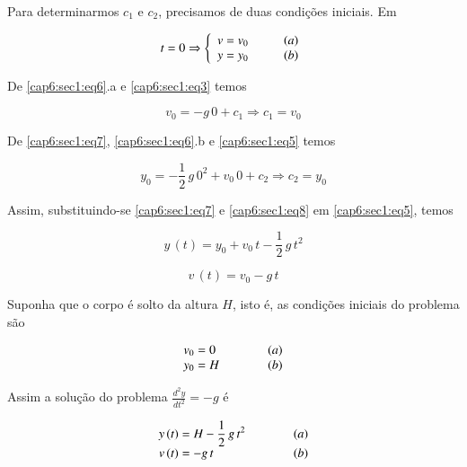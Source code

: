 Para determinarmos $ c_1 $ e $ c_2 $, precisamos de duas condições iniciais. Em

\begin{equation}
 \label{cap6:sec1:eq6}
 t = 0 \Rightarrow
 \left\{
 \begin{array}{l}
  v = v_0 \hspace*{1cm} (a)\\
  y = y_0 \hspace*{1cm} (b)
 \end{array}
 \right.
\end{equation}

De \ref{cap6:sec1:eq6}.a e \ref{cap6:sec1:eq3} temos

\begin{equation}
 \label{cap6:sec1:eq7}
 v_0 = -g \, 0 + c_1 \Rightarrow c_1 = v_0
\end{equation}

De \ref{cap6:sec1:eq7}, \ref{cap6:sec1:eq6}.b e \ref{cap6:sec1:eq5} temos

\begin{equation}
 \label{cap6:sec1:eq8}
 y_0 = -\frac{1}{2} \, g \, 0^2 + v_0 \, 0 + c_2 \Rightarrow c_2 = y_0
\end{equation}

Assim, substituindo-se \ref{cap6:sec1:eq7} e \ref{cap6:sec1:eq8} em \ref{cap6:sec1:eq5}, temos

\begin{equation}
 \label{cap6:sec1:eq9}
 y \, (t) = y_0 + v_0 \, t - \frac{1}{2} \, g \, t^2
\end{equation}

\begin{equation}
 \label{cap6:sec1:eq10}
 v \, (t) = v_0 - g \, t
\end{equation}

Suponha que o corpo é solto da altura $ H $, isto é, as condições iniciais do problema são

\begin{equation}
 \label{cap6:sec1:eq11}
 \begin{array}{lr}
  v_0 = 0 & \hspace*{1cm} (a) \\
  y_0 = H & \hspace*{1cm} (b)
 \end{array}
\end{equation}

Assim a solução do problema $ \displaystyle \frac{d^2y}{dt^2} = -g $ é

\begin{equation}
\label{cap6:sec1:eq12}
 \begin{array}{lr}
  y \, (t) = H - \displaystyle \frac{1}{2} \, g \, t^2 & \hspace*{1cm} (a) \\
  v \, (t) = -g \, t & \hspace*{1cm} (b)
 \end{array}
\end{equation}

